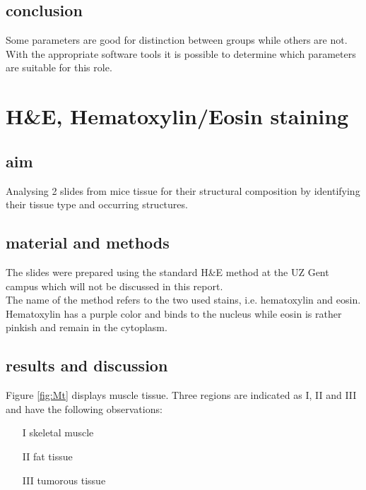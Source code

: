 \documentclass[dutch, a4paper, 11pt]{article}
\begin{document}
\begin{multicols}{2}
\subsection{conclusion}

Some parameters are good for distinction between groups while others are not. With the 
appropriate software tools it is possible to determine which parameters are suitable for this role.


\section{H\&E, Hematoxylin/Eosin staining}

\subsection{aim}

Analysing 2 slides from mice tissue for their structural composition by identifying their tissue type and occurring structures.

\subsection{material and methods}

The slides were prepared using the standard H\&E method at the UZ Gent campus which will not be discussed in this report.\\
The name of the method refers to the two used stains, i.e. hematoxylin and eosin. Hematoxylin has a purple color and binds to the nucleus while eosin is rather pinkish and remain in the cytoplasm.

\subsection{results and discussion}

Figure \ref{fig:Mt} displays muscle tissue. Three regions are indicated as I, II and III and have the following observations:
\begin{itemize}
    \item[I] skeletal muscle
    \item[II] fat tissue
    \item[III] tumorous tissue
\end{itemize}


\end{multicols}
\end{document}
